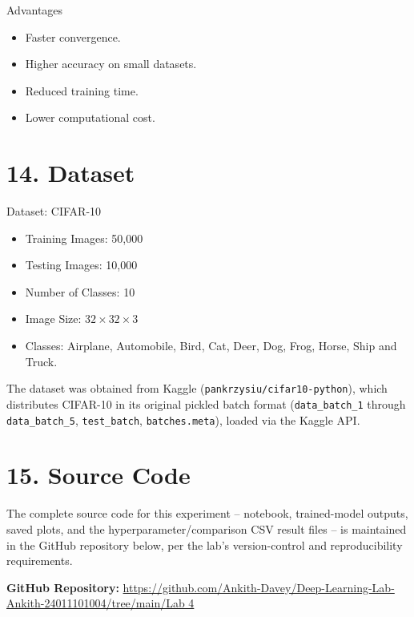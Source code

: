 \documentclass[11pt]{article}
\begin{document}
Advantages

\begin{itemize}
\item Faster convergence.
\item Higher accuracy on small datasets.
\item Reduced training time.
\item Lower computational cost.
\end{itemize}


\section*{14. Dataset}

Dataset: CIFAR-10

\begin{itemize}
\item Training Images: 50,000
\item Testing Images: 10,000
\item Number of Classes: 10
\item Image Size: $32\times32\times3$
\item Classes: Airplane, Automobile, Bird, Cat, Deer, Dog, Frog, Horse, Ship and Truck.
\end{itemize}

The dataset was obtained from Kaggle (\texttt{pankrzysiu/cifar10-python}),
which distributes CIFAR-10 in its original pickled batch format
(\texttt{data\_batch\_1} through \texttt{data\_batch\_5}, \texttt{test\_batch},
\texttt{batches.meta}), loaded via the Kaggle API.


\section*{15. Source Code}

The complete source code for this experiment -- notebook, trained-model
outputs, saved plots, and the hyperparameter/comparison CSV result files --
is maintained in the GitHub repository below, per the lab's version-control
and reproducibility requirements.

\vspace{3mm}

\noindent \textbf{GitHub Repository:} \href{https://github.com/Ankith-Davey/Deep-Learning-Lab-Ankith-24011101004/tree/main/Lab 4}{https://github.com/Ankith-Davey/Deep-Learning-Lab-Ankith-24011101004/tree/main/Lab 4}
\end{document}
